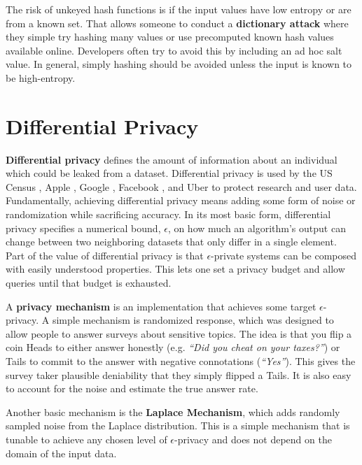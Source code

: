 \documentclass[nobib]{tufte-handout}
\begin{document}
The risk of unkeyed hash functions is if the input values have low entropy or
are from a known set. That allows someone to conduct a \textbf{dictionary
attack} where they simple try hashing many values or use precomputed known hash
values available online. Developers often try to avoid this by including an ad
hoc salt value. In general, simply hashing should be avoided unless the input is
known to be high-entropy.

\section{Differential Privacy}

\textbf{Differential privacy} defines the amount of information about an
individual which could be leaked from a dataset. Differential privacy is used by
the US Census \cite{census-differential-privacy}, Apple
\cite{apple-differential-privacy}, Google \cite{google-differential-privacy},
Facebook \cite{facebook-url-release}, and Uber \cite{uber-differential-privacy}
to protect research and user data. Fundamentally, achieving differential privacy
means adding some form of noise or randomization while sacrificing accuracy.
In its most basic form, differential privacy specifies a numerical bound,
$\epsilon$, on how much an algorithm’s output can change between two neighboring
datasets that only differ in a single element. Part of the value of differential
privacy is that $\epsilon$-private systems can be composed with easily
understood properties. This lets one set a privacy budget and allow queries
until that budget is exhausted.

A \textbf{privacy mechanism} is an implementation that achieves some target
$\epsilon$-privacy. A simple mechanism is randomized response, which was
designed to allow people to answer surveys about sensitive topics. The idea is
that you flip a coin Heads to either answer honestly (e.g. \textit{“Did you
cheat on your taxes?”}) or Tails to commit to the answer with negative
connotations (\textit{“Yes”}). This gives the survey taker plausible deniability
that they simply flipped a Tails. It is also easy to account for the noise and
estimate the true answer rate.

Another basic mechanism is the \textbf{Laplace Mechanism}, which adds randomly
sampled noise from the Laplace distribution. This is a simple mechanism that is
tunable to achieve any chosen level of $\epsilon$-privacy and does not depend on
the domain of the input data.
\end{document}
